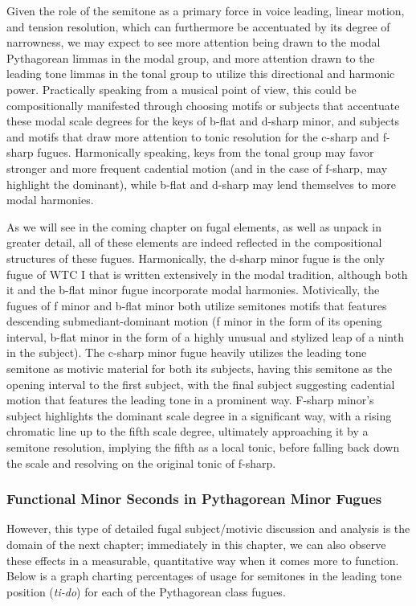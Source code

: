 Given the role of the semitone as a primary force in voice leading,
linear motion, and tension resolution, which can furthermore be
accentuated by its degree of narrowness, we may expect to see more
attention being drawn to the modal Pythagorean limmas in the modal
group, and more attention drawn to the leading tone limmas in the tonal
group to utilize this directional and harmonic power. Practically
speaking from a musical point of view, this could be compositionally
manifested through choosing motifs or subjects that accentuate these
modal scale degrees for the keys of b-flat and d-sharp minor, and
subjects and motifs that draw more attention to tonic resolution for the
c-sharp and f-sharp fugues. Harmonically speaking, keys from the tonal
group may favor stronger and more frequent cadential motion (and in the
case of f-sharp, may highlight the dominant), while b-flat and d-sharp
may lend themselves to more modal harmonies.

As we will see in the coming chapter on fugal elements, as well as
unpack in greater detail, all of these elements are indeed reflected in
the compositional structures of these fugues. Harmonically, the d-sharp
minor fugue is the only fugue of WTC I that is written extensively in
the modal tradition, although both it and the b-flat minor fugue
incorporate modal harmonies. Motivically, the fugues of f minor and
b-flat minor both utilize semitones motifs that features descending
submediant-dominant motion (f minor in the form of its opening interval,
b-flat minor in the form of a highly unusual and stylized leap of a
ninth in the subject). The c-sharp minor fugue heavily utilizes the
leading tone semitone as motivic material for both its subjects, having
this semitone as the opening interval to the first subject, with the
final subject suggesting cadential motion that features the leading tone
in a prominent way. F-sharp minor's subject highlights the dominant
scale degree in a significant way, with a rising chromatic line up to
the fifth scale degree, ultimately approaching it by a semitone
resolution, implying the fifth as a local tonic, before falling back
down the scale and resolving on the original tonic of f-sharp.

    \subsubsection{Functional Minor Seconds in Pythagorean Minor
Fugues}\label{functional-minor-seconds-in-pythagorean-minor-fugues}

However, this type of detailed fugal subject/motivic discussion and
analysis is the domain of the next chapter; immediately in this chapter,
we can also observe these effects in a measurable, quantitative way when
it comes more to function. Below is a graph charting percentages of
usage for semitones in the leading tone position (\emph{ti-do}) for each
of the Pythagorean class fugues.




